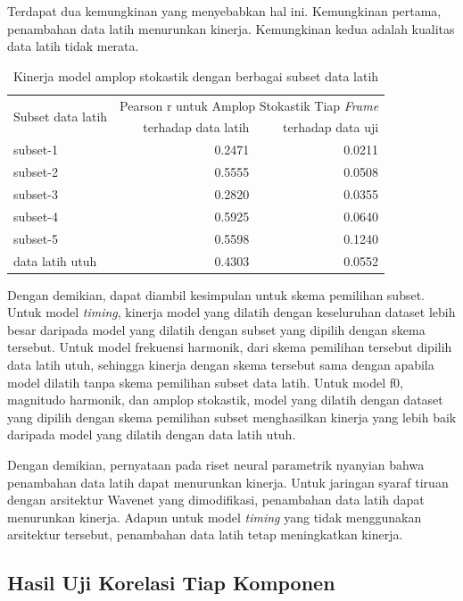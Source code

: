 Terdapat dua kemungkinan yang menyebabkan hal ini. Kemungkinan pertama, penambahan data latih menurunkan kinerja. Kemungkinan kedua adalah kualitas data latih tidak merata.

\begin{table}[htbp]
    \centering
    \caption{Kinerja model amplop stokastik dengan berbagai subset data latih}\label{tab-stoc-model-subset-results}
    \begin{tabular}{ |l|r|r| } 
     \hline
     \multirow{2}{*}{Subset data latih} & \multicolumn{2}{l|}{Pearson r untuk Amplop Stokastik Tiap \textit{Frame}} \\
     \cline{2-3}
     & terhadap data latih & terhadap data uji \\\hline
	subset-1       &0.2471  &0.0211\\\hline
	subset-2       &0.5555  &0.0508\\\hline
	subset-3       &0.2820  &0.0355\\\hline
	subset-4       &0.5925  &0.0640\\\hline
	subset-5       &0.5598  &0.1240\\\hline
	data latih utuh       &0.4303  &0.0552\\\hline
    \end{tabular}
\end{table}

Dengan demikian, dapat diambil kesimpulan untuk skema pemilihan subset. Untuk model \textit{timing}, kinerja model yang dilatih dengan keseluruhan dataset lebih besar daripada model yang dilatih dengan subset yang dipilih dengan skema tersebut. Untuk model frekuensi harmonik, dari skema pemilihan tersebut dipilih data latih utuh, sehingga kinerja dengan skema tersebut sama dengan apabila model dilatih tanpa skema pemilihan subset data latih. Untuk model f0, magnitudo harmonik, dan amplop stokastik, model yang dilatih dengan dataset yang dipilih dengan skema pemilihan subset menghasilkan kinerja yang lebih baik daripada model yang dilatih dengan data latih utuh.

Dengan demikian, pernyataan pada riset neural parametrik nyanyian bahwa penambahan data latih dapat menurunkan kinerja. Untuk jaringan syaraf tiruan dengan arsitektur Wavenet yang dimodifikasi, penambahan data latih dapat menurunkan kinerja. Adapun untuk model \textit{timing} yang tidak menggunakan arsitektur tersebut, penambahan data latih tetap meningkatkan kinerja.

\subsection{Hasil Uji Korelasi Tiap Komponen}

